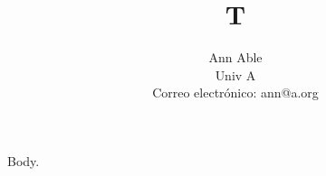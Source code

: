 \documentclass{article}
\begin{document}
\title{T}
\author{Ann Able \\ Univ A \\ Correo electr\'onico: ann@a.org}
\maketitle
Body.
\end{document}
